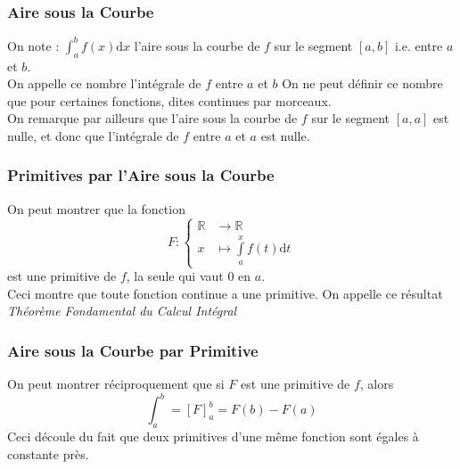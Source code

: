\documentclass{beamercours}
\begin{document}
        \begin{frame}
        \frametitle{Aire sous la Courbe}
            On note : $\int_{a}^{b} f(x) \mathrm{d}x$ l'aire sous la courbe de $f$ sur le segment $\left[a, b\right]$ i.e. entre $a$ et $b$.\\
            On appelle ce nombre l'intégrale de $f$ entre $a$ et $b$
            On ne peut définir ce nombre que pour certaines fonctions, dites continues par morceaux.\\
            On remarque par ailleurs que l'aire sous la courbe de $f$ sur le segment $\left[a, a\right]$ est nulle, et donc que l'intégrale de $f$ entre $a$ et $a$ est nulle. 
        \end{frame}

        \begin{frame}
            \frametitle{Primitives par l'Aire sous la Courbe}
            On peut montrer que la fonction \[F : 
                \begin{cases}
                    \mathbb{R} &\rightarrow \mathbb{R}\\
                    x &\mapsto \int\limits_{a}^{x} f(t) \mathrm{d}t 
                \end{cases}
            \]
            est une primitive de $f$, la seule qui vaut $0$ en $a$. \\
            Ceci montre que toute fonction continue a une primitive. On appelle ce résultat \textsl{Théorème Fondamental du Calcul Intégral}
        \end{frame}
        \begin{frame}
            \frametitle{Aire sous la Courbe par Primitive}
            On peut montrer réciproquement que si $F$ est une primitive de $f$, alors \[
                \int_{a}^{b} = \left[F\right]_{a}^{b} = F(b) - F(a)
            \]
            Ceci découle du fait que deux primitives d'une même fonction sont égales à constante près.
        
        \end{frame}

    
\end{document}
